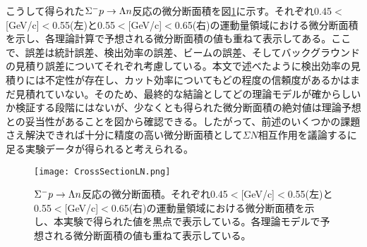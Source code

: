 こうして得られた$\SM p\rightarrow\Lambda n$反応の微分断面積を図\ref{fig:CrossSectionLN}に示す。それぞれ0.45$<$[GeV/c]$<$0.55(左)と0.55$<$[GeV/c]$<$0.65(右)の運動量領域における微分断面積を示し、各理論計算で予想される微分断面積の値も重ねて表示してある。ここで、誤差は統計誤差、検出効率の誤差、ビームの誤差、そしてバックグラウンドの見積り誤差についてそれぞれ考慮している。本文で述べたように検出効率の見積りには不定性が存在し、カット効率についてもどの程度の信頼度があるかはまだ見積れていない。そのため、最終的な結論としてどの理論モデルが確からしいか検証する段階にはないが、少なくとも得られた微分断面積の絶対値は理論予想との妥当性があることを図から確認できる。したがって、前述のいくつかの課題さえ解決できれば十分に精度の高い微分断面積として$\Sigma N$相互作用を議論するに足る実験データが得られると考えられる。
\begin{figure}[!tbp]
 \begin{center}
   \texttt{[image: CrossSectionLN.png]}
   \caption[$\SM p\rightarrow\Lambda n$反応の微分断面積]
           {$\SM p\rightarrow\Lambda n$反応の微分断面積。それぞれ0.45$<$[GeV/c]$<$0.55(左)と0.55$<$[GeV/c]$<$0.65(右)の運動量領域における微分断面積を示し、本実験で得られた値を黒点で表示している。各理論モデルで予想される微分断面積の値も重ねて表示している。}
           \label{fig:CrossSectionLN}
 \end{center}
\end{figure}


